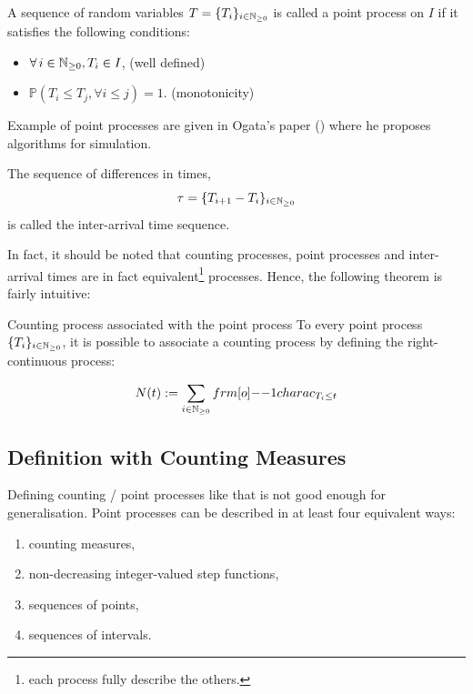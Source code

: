 \documentclass[11pt]{book}
\newcommand{\sequence}[1]{\{ #1 \}_{ i \in \N} }
\begin{document}
\begin{definition}
\label{def:point}
A sequence of random variables $T = \sequence{ T_i } $ is called a point process on $I$ if it satisfies the following conditions:

\begin{itemize}
\item $\forall i \in \N, T_i \in I$, (well defined)
\item $\mathbb P ( T_i \leq T_j, \forall i \leq j) = 1$. (monotonicity)
\end{itemize}
\end{definition}

Example of point processes are given in Ogata's paper (\cite{Ogata}) where he proposes algorithms for simulation.


\begin{remarque}
\label{remarque:inter_arrival_times}
The sequence of differences in times, $$\tau = \sequence{ T_{i+1} - T_i } $$ is called the inter-arrival time sequence.
\end{remarque}


In fact, it should be noted that counting processes, point processes and inter-arrival times are in fact equivalent\footnote{each process fully describe the others.} processes. Hence, the following theorem is fairly intuitive:

\begin{theoreme}{Counting process associated with the point process}
To every point process $\sequence{T_i}$, it is possible to associate a counting process by defining the right-continuous process:

$$ N(t) := \sum_{ i \in \N} \11charac_{ T_i \leq t } $$ 

\end{theoreme}

\subsection{Definition with Counting Measures}
Defining counting / point processes like that is not good enough for generalisation. Point processes can be described in at least four equivalent ways:

\begin{enumerate}
\item counting measures,
\item non-decreasing integer-valued step functions,
\item sequences of points,
\item sequences of intervals.
\end{enumerate}
\end{document}
